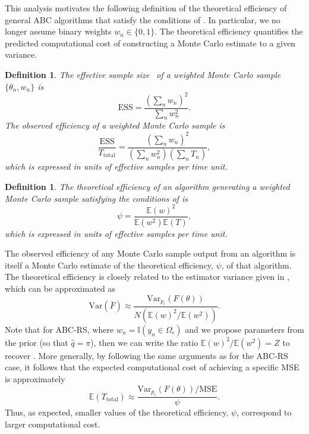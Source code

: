 \documentclass[12pt, onecolumn]{article}
\newtheorem{definition}[theorem]{Definition}
\begin{document}
This analysis motivates the following definition of the theoretical efficiency of general ABC algorithms that satisfy the conditions of .
In particular, we no longer assume binary weights $w_n \in \{ 0,1\}$.
The theoretical efficiency quantifies the predicted computational cost of constructing a Monte Carlo estimate to a given variance.

\begin{definition}
\label{def:efficiency:obs}
The \emph{effective sample size}~\cite{Elvira2018} of a weighted Monte Carlo sample $\{ \theta_n, w_n \}$ is 
\[
\mathrm{ESS} = \frac{\left(\sum_n w_n\right)^2}{\sum_n w_n^2}.
\]
The \emph{observed efficiency} of a weighted Monte Carlo sample is
\[
\frac{\mathrm{ESS}}{T_{\mathrm{total}}} = \frac{\left(\sum_n w_n\right)^2}{\left( \sum_n w_n^2 \right) \left( \sum_n T_n \right)},
\]
which is expressed in units of effective samples per time unit.
\end{definition}
\begin{definition}
\label{def:efficiency:th}
The \emph{theoretical efficiency} of an algorithm generating a weighted Monte Carlo sample satisfying the conditions of  is
\[
	\psi = \frac{\mathbb E(w)^2}{\mathbb E(w^2) \mathbb E(T)},
\]
which is expressed in units of effective samples per time unit.
\end{definition}

The observed efficiency of any Monte Carlo sample output from an algorithm is itself a Monte Carlo estimate of the theoretical efficiency, $\psi$, of that algorithm.
The theoretical efficiency is closely related to the estimator variance given in , which can be approximated as
\[
\mathrm{Var} \left( \bar F \right) 
\approx
\frac{\mathrm{Var}_{p_\epsilon}(F(\theta))}{N \left( \mathbb E(w)^2 / \mathbb E(w^2) \right) }.
\]
Note that for ABC-RS, where $w_n = \mathbb I(y_n \in \Omega_\epsilon)$ and we propose parameters from the prior (so that $\hat q = \pi$), then we can write the ratio $\mathbb E(w)^2/\mathbb E(w^2) = Z$ to recover .
More generally, by following the same arguments as for the ABC-RS case, it follows that the expected computational cost of achieving a specific MSE is approximately
\[
\mathbb E(T_{\mathrm{total}}) \approx \frac{\mathrm{Var}_{p_\epsilon}(F(\theta)) / \mathrm{MSE}}{\psi}.
\]
Thus, as expected, smaller values of the theoretical efficiency, $\psi$, correspond to larger computational cost.
\end{document}
